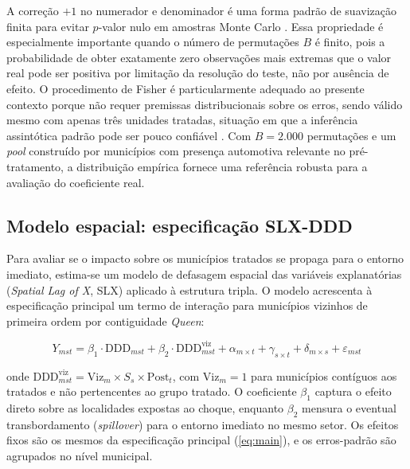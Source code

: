 \documentclass[12pt,a4paper]{article}
\begin{document}
A corre\c{c}\~ao $+1$ no numerador e denominador \'e uma forma padr\~ao de suaviza\c{c}\~ao finita para evitar $p$-valor nulo em amostras Monte Carlo \parencite{olden2022}. Essa propriedade \'e especialmente importante quando o n\'umero de permuta\c{c}\~oes $B$ \'e finito, pois a probabilidade de obter exatamente zero observa\c{c}\~oes mais extremas que o valor real pode ser positiva por limita\c{c}\~ao da resolu\c{c}\~ao do teste, n\~ao por aus\^encia de efeito. O procedimento de Fisher \'e particularmente adequado ao presente contexto porque n\~ao requer premissas distribucionais sobre os erros, sendo v\'alido mesmo com apenas tr\^es unidades tratadas, situa\c{c}\~ao em que a infer\^encia assint\'otica padr\~ao pode ser pouco confi\'avel \parencite{olden2022}. Com $B = 2.000$ permuta\c{c}\~oes e um \textit{pool} constru\'ido por munic\'ipios com presen\c{c}a automotiva relevante no pr\'e-tratamento, a distribui\c{c}\~ao emp\'irica fornece uma refer\^encia robusta para a avalia\c{c}\~ao do coeficiente real.

\subsection{Modelo espacial: especifica\c{c}\~ao SLX-DDD}
\label{sub:slxddd}

Para avaliar se o impacto sobre os munic\'ipios tratados se propaga para o entorno imediato, estima-se um modelo de defasagem espacial das vari\'aveis explanat\'orias (\textit{Spatial Lag of X}, SLX) aplicado \`a estrutura tripla. O modelo acrescenta \`a especifica\c{c}\~ao principal um termo de intera\c{c}\~ao para munic\'ipios vizinhos de primeira ordem por contiguidade \textit{Queen}:

\begin{equation}
Y_{mst} = \beta_1 \cdot \text{DDD}_{mst} + \beta_2 \cdot \text{DDD}^{\text{viz}}_{mst} + \alpha_{m \times t} + \gamma_{s \times t} + \delta_{m \times s} + \varepsilon_{mst}
\label{eq:slxddd}
\end{equation}

\noindent onde $\text{DDD}^{\text{viz}}_{mst} = \text{Viz}_m \times S_s \times \text{Post}_t$, com $\text{Viz}_m = 1$ para munic\'ipios cont\'iguos aos tratados e n\~ao pertencentes ao grupo tratado. O coeficiente $\beta_1$ captura o efeito direto sobre as localidades expostas ao choque, enquanto $\beta_2$ mensura o eventual transbordamento (\textit{spillover}) para o entorno imediato no mesmo setor. Os efeitos fixos s\~ao os mesmos da especifica\c{c}\~ao principal (\ref{eq:main}), e os erros-padr\~ao s\~ao agrupados no n\'ivel municipal.
\end{document}
